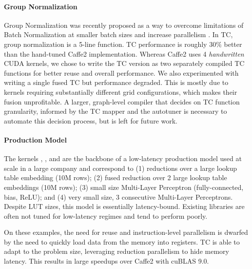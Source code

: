 \paragraph{Group Normalization}
Group Normalization was recently proposed as a way to overcome limitations of
Batch Normalization at smaller batch sizes and increase parallelism
\cite{GroupNorm}. In TC,
group normalization is a 5-line function. TC performance is
roughly $30\%$ better than the hand-tuned Caffe2 implementation. Whereas Caffe2
uses 4 \emph{handwritten} CUDA kernels, we chose to write the TC version as two
separately compiled TC functions for better reuse and overall performance.
We also experimented with writing a single fused TC but performance degraded.
This is mostly due to kernels requiring substantially different grid
configurations, which makes their fusion unprofitable.  A larger, graph-level
compiler that decides on TC function granularity, informed by the TC mapper and
the autotuner is necessary to automate this decision process, but is left for
future work.

\paragraph{Production Model}
The kernels , ,  and  are the
backbone of a low-latency production model used at scale in a large company
and correspond to (1) reductions over a large lookup table embedding (10M
rows); (2) fused reduction over 2 large lookup table embeddings (10M rows);
(3) small size Multi-Layer Perceptron (fully-connected, bias, ReLU); and
(4) very small size, 3 consecutive Multi-Layer Perceptrons.
Despite LUT sizes, this model is essentially latency-bound.
Existing libraries are often not tuned for low-latency regimes and tend to
perform poorly.

On these examples, the need for reuse and instruction-level
parallelism is dwarfed by the need to quickly load data from the memory
into registers. TC is able to adapt to the problem size, leveraging
reduction parallelism to hide memory latency.
This results in large speedups over Caffe2 with cuBLAS 9.0.

